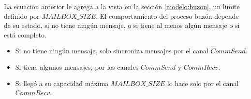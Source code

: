 La ecuación anterior le agrega a la vista en la sección \ref{modelo:buzon}, un limite definido por $MAILBOX\_SIZE$. El comportamiento del proceso buzón depende de su estado, si no tiene ningún mensaje, o si tiene al menos algún mensaje o si está completo.

\begin{itemize}
\item Si no tiene ningún mensaje, solo sincroniza mensajes por el canal $CommSend$.
\item Si tiene algunos mensajes, por los canales $CommSend$ y $CommRecv$.
\item Si llegó a su capacidad máxima $MAILBOX\_SIZE$ lo hace solo por el canal $CommRecv$.
\end{itemize}


